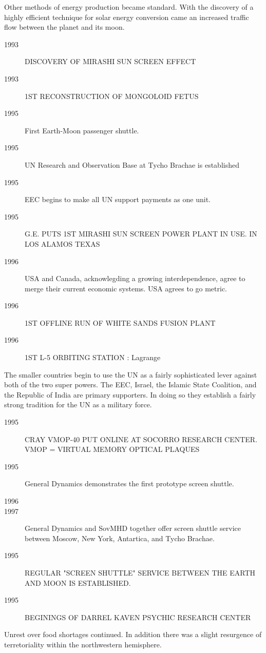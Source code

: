 Other methods of energy production became standard. With the 
discovery of a highly efficient technique for solar energy conversion 
came an increased traffic flow between the planet and its moon.
\begin{description}
	\item[1993] DISCOVERY OF MIRASHI SUN SCREEN EFFECT
	\item[1993] 1ST RECONSTRUCTION OF MONGOLOID FETUS
	\item[1995] First Earth-Moon passenger shuttle.  
	\item[1995] UN Research and Observation Base at Tycho Brachae is established
	\item[1995] EEC begins to make all UN support payments as one unit.
	\item[1995] G.E. PUTS 1ST MIRASHI SUN SCREEN POWER PLANT IN USE.
IN LOS ALAMOS TEXAS
	\item[1996] USA and Canada, acknowlegding a growing interdependence, agree 
to merge their current economic systems. USA agrees to go metric.
	\item[1996] 1ST OFFLINE RUN OF WHITE SANDS FUSION PLANT
	\item[1996] 1ST L-5 ORBITING STATION : Lagrange
\end{description}

The smaller countries begin to use the UN as a fairly sophisticated 
lever against both of the two super powers. The EEC, Israel, the 
Islamic State Coalition, and the Republic of India are primary 
supporters. In doing so they establish a fairly strong tradition for 
the UN as a military force. 
\begin{description}
	\item[1995] CRAY VMOP-40 PUT ONLINE AT SOCORRO RESEARCH CENTER.
VMOP = VIRTUAL MEMORY OPTICAL PLAQUES
	\item[1995] General Dynamics demonstrates the first prototype screen 
shuttle.                                            
	\item[1996] 
	\item[1997] General Dynamics and SovMHD together offer screen shuttle 
service between Moscow, New York, Antartica, and Tycho Brachae. 
	\item[1995]  REGULAR "SCREEN SHUTTLE" SERVICE BETWEEN THE EARTH AND
MOON IS ESTABLISHED.
	\item[1995]   BEGININGS OF DARREL KAVEN PSYCHIC RESEARCH CENTER
\end{description}

Unrest over food shortages continued. In addition there was
a slight resurgence of terretoriality within the
northwestern hemisphere.


